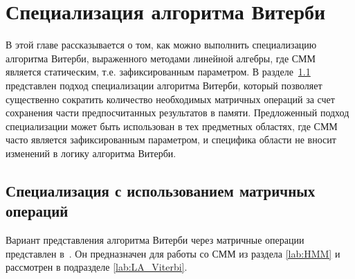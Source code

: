 \section{Специализация алгоритма Витерби}
В этой главе рассказывается о том, как можно выполнить 
специализацию алгоритма Витерби, выраженного методами 
линейной алгебры, где СММ является статическим, т.е. 
зафиксированным параметром.
В разделе~\ref{lab:LA_spec} представлен подход специализации 
алгоритма Витерби, который позволяет существенно сократить 
количество необходимых матричных операций за счет сохранения 
части предпосчитанных результатов в памяти.
Предложенный подход специализации может быть использован в тех предметных областях, где СММ часто является зафиксированным параметром, и специфика области не вносит изменений в логику алгоритма Витерби.

\subsection{Специализация с использованием матричных\\ операций}
\label{lab:LA_spec}
Вариант представления
алгоритма Витерби через матричные операции представлен в~\cite{LA_Viterbi}.
Он предназначен для работы со СММ из раздела 
\ref{lab:HMM} и рассмотрен в подразделе 
\ref{lab:LA_Viterbi}.


